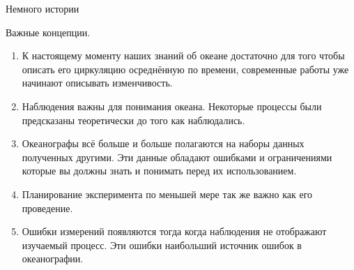 \begin{chapter}{Немного истории}
\begin{section}{Важные концепции.}
\begin{enumerate}
\item
К настоящему моменту наших знаний об океане достаточно для того чтобы
описать его циркуляцию осреднённую по времени, современные работы уже
начинают описывать изменчивость.

\item
Наблюдения важны для понимания океана. Некоторые процессы были
предсказаны теоретически до того как наблюдались.

\item
Океанографы всё больше и больше полагаются на наборы данных полученных
другими. Эти данные обладают ошибками и ограничениями которые вы
должны знать и понимать перед их использованием.

\item
Планирование эксперимента по меньшей мере так же важно как его
проведение.

\item
Ошибки измерений появляются тогда когда наблюдения не отображают
изучаемый процесс. Эти ошибки наибольший источник ошибок в
океанографии.
\end{enumerate}
\end{section}

\end{chapter}
